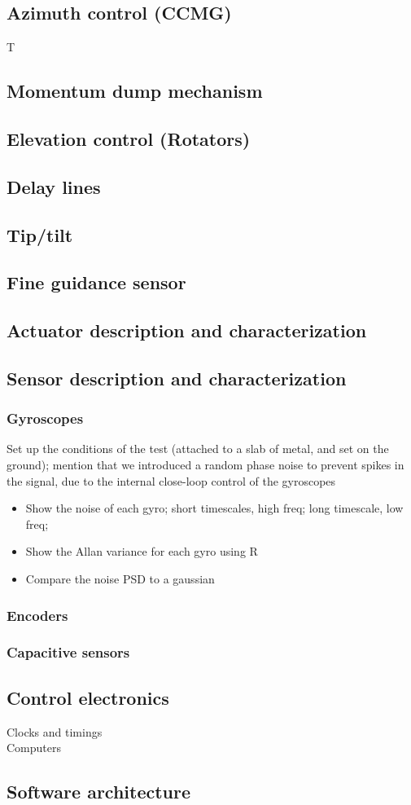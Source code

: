 \subsection{Azimuth control (CCMG)}

T
\subsection{Momentum dump mechanism}
\subsection{Elevation control (Rotators)}
\subsection{Delay lines}
\subsection{Tip/tilt}
\subsection{Fine guidance sensor}


\subsection{Actuator description and characterization}
\subsection{Sensor description and characterization}
\subsubsection{Gyroscopes}
Set up the conditions of the test (attached to a slab of metal, and set on the ground); mention that we introduced a random phase noise to prevent spikes in the signal, due to the internal close-loop control of the gyroscopes
\begin{itemize}
\item Show the noise of each gyro; short timescales, high freq; long timescale, low freq;
\item Show the Allan variance for each gyro using R
\item Compare the noise PSD to a gaussian
\end{itemize}
\subsubsection{Encoders}
\subsubsection{Capacitive sensors}
\subsubsection{}
\subsection{Control electronics}
Clocks and timings \\
Computers
\subsection{Software architecture}
